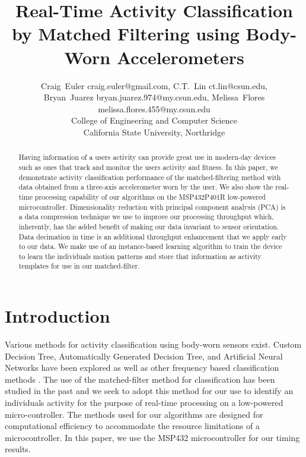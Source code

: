 \documentclass[conference]{IEEEtran}
\begin{document}
%
\title{Real-Time Activity Classification by Matched Filtering using Body-Worn Accelerometers}
%
\author{Craig~Euler craig.euler@gmail.com, C.T.~Lin ct.lin@csun.edu,\\Bryan~Juarez bryan.juarez.974@my.csun.edu, Melissa~Flores melissa.flores.455@my.csun.edu\\College of Engineering and Computer Science\\California State University, Northridge}
%
\maketitle
%
\begin{abstract}
Having information of a user\textquotesingle s activity can provide great use in modern-day devices such as ones that track and monitor the user\textquotesingle s activity and fitness.
In this paper, we demonstrate activity classification performance of the matched-filtering method with data obtained from a three-axis accelerometer worn by the user.
We also show the real-time processing capability of our algorithms on the MSP432P401R low-powered microcontroller.
Dimensionality reduction with principal component analysis (PCA) \cite{bishop_2006} is a data compression technique we use to improve our processing throughput which, inherently, has the added benefit of making our data invariant to sensor orientation.
Data decimation in time is an additional throughput enhancement that we apply early to our data.
We make use of an instance-based learning algorithm to train the device to learn the individual\textquotesingle s motion patterns and store that information as activity templates for use in our matched-filter.
\end{abstract}
%
\section{Introduction}
Various methods for activity classification using body-worn sensors exist.
Custom Decision Tree, Automatically Generated Decision Tree, and Artificial Neural Networks \cite{parkka_ermes_korpipaa_mantyjarvi_peltola_korhonen_2006} have been explored as well as other frequency based classification methods \cite{sharma_purwar_lee_lee_chung_2008}.
The use of the matched-filter method for classification has been studied in the past \cite{giannakis_tsatsanis_1990} and we seek to adopt this method for our use to identify an individual\textquotesingle s activity for the purpose of real-time processing on a low-powered micro-controller.
The methods used for our algorithms are designed for computational efficiency to accommodate the resource limitations of a microcontroller. In this paper, we use the MSP432 microcontroller for our timing results.
\end{document}
